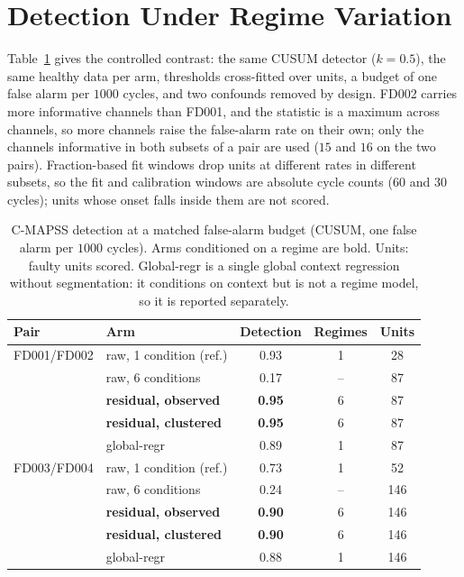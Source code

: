 \documentclass[journal]{IEEEtran}
\begin{document}
\section{Detection Under Regime Variation}

Table~\ref{tab:contrast} gives the controlled contrast: the same CUSUM detector ($k{=}0.5$), the same
healthy data per arm, thresholds cross-fitted over units, a budget of one false alarm per $1000$ cycles,
and two confounds removed by design. FD002 carries more informative channels than FD001, and the statistic
is a maximum across channels, so more channels raise the false-alarm rate on their own; only the channels
informative in both subsets of a pair are used ($15$ and $16$ on the two pairs). Fraction-based fit windows
drop units at different rates in different subsets, so the fit and calibration windows are absolute cycle
counts ($60$ and $30$ cycles); units whose onset falls inside them are not scored.

\begin{table}[!t]
\caption{C-MAPSS detection at a matched false-alarm budget (CUSUM, one false alarm per $1000$ cycles).
Arms conditioned on a regime are bold. Units: faulty units scored. Global-regr is a single global
context regression without segmentation: it conditions on context but is not a regime model, so it is
reported separately.}
\label{tab:contrast}
\centering
\footnotesize
\begin{tabular}{@{}llccc@{}}
\toprule
Pair & Arm & Detection & Regimes & Units \\
\midrule
FD001/FD002 & raw, 1 condition (ref.) & 0.93 & 1 & 28 \\
 & raw, 6 conditions & 0.17 & -- & 87 \\
 & \textbf{residual, observed} & \textbf{0.95} & 6 & 87 \\
 & \textbf{residual, clustered} & \textbf{0.95} & 6 & 87 \\
 & global-regr & 0.89 & 1 & 87 \\
\midrule
FD003/FD004 & raw, 1 condition (ref.) & 0.73 & 1 & 52 \\
 & raw, 6 conditions & 0.24 & -- & 146 \\
 & \textbf{residual, observed} & \textbf{0.90} & 6 & 146 \\
 & \textbf{residual, clustered} & \textbf{0.90} & 6 & 146 \\
 & global-regr & 0.88 & 1 & 146 \\
\bottomrule
\end{tabular}
\end{table}
\end{document}
